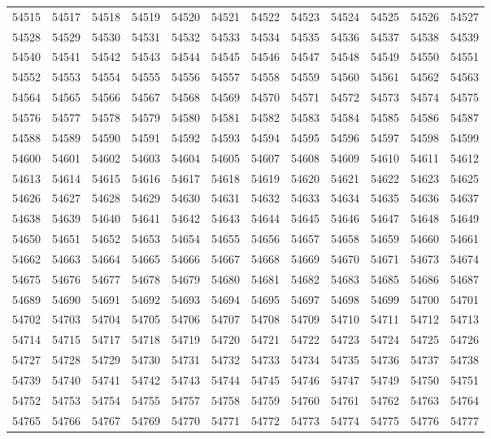 \begin{center}
\begin{longtable}{llllllllllll}
54515 &54517 &54518 &54519 &54520 &54521 &54522 &54523 &54524 &54525 &54526 &54527 \\
54528 &54529 &54530 &54531 &54532 &54533 &54534 &54535 &54536 &54537 &54538 &54539 \\
54540 &54541 &54542 &54543 &54544 &54545 &54546 &54547 &54548 &54549 &54550 &54551 \\
54552 &54553 &54554 &54555 &54556 &54557 &54558 &54559 &54560 &54561 &54562 &54563 \\
54564 &54565 &54566 &54567 &54568 &54569 &54570 &54571 &54572 &54573 &54574 &54575 \\
54576 &54577 &54578 &54579 &54580 &54581 &54582 &54583 &54584 &54585 &54586 &54587 \\
54588 &54589 &54590 &54591 &54592 &54593 &54594 &54595 &54596 &54597 &54598 &54599 \\
54600 &54601 &54602 &54603 &54604 &54605 &54607 &54608 &54609 &54610 &54611 &54612 \\
54613 &54614 &54615 &54616 &54617 &54618 &54619 &54620 &54621 &54622 &54623 &54625 \\
54626 &54627 &54628 &54629 &54630 &54631 &54632 &54633 &54634 &54635 &54636 &54637 \\
54638 &54639 &54640 &54641 &54642 &54643 &54644 &54645 &54646 &54647 &54648 &54649 \\
54650 &54651 &54652 &54653 &54654 &54655 &54656 &54657 &54658 &54659 &54660 &54661 \\
54662 &54663 &54664 &54665 &54666 &54667 &54668 &54669 &54670 &54671 &54673 &54674 \\
54675 &54676 &54677 &54678 &54679 &54680 &54681 &54682 &54683 &54685 &54686 &54687 \\
54689 &54690 &54691 &54692 &54693 &54694 &54695 &54697 &54698 &54699 &54700 &54701 \\
54702 &54703 &54704 &54705 &54706 &54707 &54708 &54709 &54710 &54711 &54712 &54713 \\
54714 &54715 &54717 &54718 &54719 &54720 &54721 &54722 &54723 &54724 &54725 &54726 \\
54727 &54728 &54729 &54730 &54731 &54732 &54733 &54734 &54735 &54736 &54737 &54738 \\
54739 &54740 &54741 &54742 &54743 &54744 &54745 &54746 &54747 &54749 &54750 &54751 \\
54752 &54753 &54754 &54755 &54757 &54758 &54759 &54760 &54761 &54762 &54763 &54764 \\
54765 &54766 &54767 &54769 &54770 &54771 &54772 &54773 &54774 &54775 &54776 &54777 \\

\end{longtable}
\end{center}
